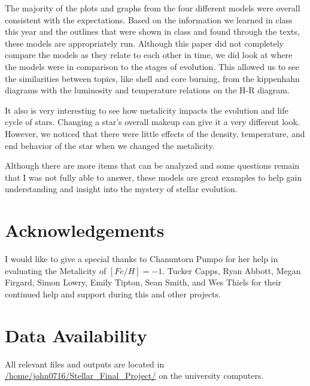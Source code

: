 \documentclass[fleqn,usenatbib]{mnras}
\begin{document}
The majority of the plots and graphs from the four different models were overall consistent with the expectations.  Based on the information we learned in class this year and the outlines that were shown in class and found through the texts, these models are appropriately run. Although this paper did not completely compare the models as they relate to each other in time, we did look at where the models were in comparison to the stages of evolution.  This allowed us to see the similarities between topics, like shell and core burning, from the kippenhahn diagrams with the luminosity and temperature relations on the H-R diagram.
\par It also is very interesting to see how metalicity impacts the evolution and life cycle of stars. Changing a star's overall makeup can give it a very different look.  However, we noticed that there were little effects of the density, temperature, and end behavior of the star when we changed the metalicity.
\par Although there are more items that can be analyzed and some questions remain that I was not fully able to answer, these models are great examples to help gain understanding and insight into the mystery of stellar evolution.

\section*{Acknowledgements}

I would like to give a special thanks to Chanuntorn Pumpo for her help in evaluating the Metalicity of $[Fe/H]=-1$.  Tucker Capps, Ryan Abbott, Megan Firgard, Simon Lowry, Emily Tipton, Sean Smith, and Wes Thiels for their continued help and support during this and other projects.

\section*{Data Availability}

 All relevant files and outputs are located in \url{/home/john0716/Stellar_Final_Project/} on the university computers.
\end{document}
